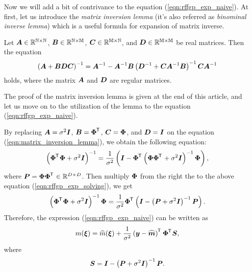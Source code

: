\documentclass[twocolumn, a4paper, 10pt]{article}
\begin{document}
Now we will add a bit of contrivance to the equation (\ref{eqn:rffgp_exp_naive}).
At first, let us introduce the \textit{matrix inversion lemma} (it's also referred as
\textit{binominal inverse lemma}) which is a useful formula for expansion of matrix inverse.  

\begin{theorem}
    Let
    $\boldsymbol{A} \in \mathbb{R^{N \times N}}$,
    $\boldsymbol{B} \in \mathbb{R^{N \times M}}$,
    $\boldsymbol{C} \in \mathbb{R^{M \times N}}$,
    and
    $\boldsymbol{D} \in \mathbb{R^{M \times M}}$
    be real matrices. Then the equation
    \begin{equation}
        \left( \boldsymbol{A} + \boldsymbol{BDC} \right)^{-1} = \boldsymbol{A}^{-1} - \boldsymbol{A}^{-1} \boldsymbol{B}
        \left( \boldsymbol{D}^{-1} + \boldsymbol{CA}^{-1} \boldsymbol{B} \right)^{-1} \boldsymbol{CA}^{-1}
        \label{eqn:matrix_inversion_lemma}
    \end{equation}
    holds, where the matrix $\boldsymbol{A}$ and $\boldsymbol{D}$ are regular matrices.
\end{theorem}

The proof of the matrix inversion lemma is given at the end of this article,
and let us move on to the utilization of the lemma to the equation (\ref{eqn:rffgp_exp_naive}).

By replacing $\boldsymbol{A} = \sigma^2 \boldsymbol{I}$, $\boldsymbol{B} = \boldsymbol{\Phi}^{\mkern-1.5mu\mathsf{T}}\hspace{0.5pt}$, $\boldsymbol{C} = \boldsymbol{\Phi}$,
and $\boldsymbol{D} = \boldsymbol{I}$ on the equation (\ref{eqn:matrix_inversion_lemma}),
we obtain the following equation:
\begin{equation}
    \left( \boldsymbol{\Phi}^{\mkern-1.5mu\mathsf{T}}\hspace{0.5pt} \boldsymbol{\Phi} + \sigma^2 \boldsymbol{I} \right)^{-1}
    = \frac{1}{\sigma^2} \left (\boldsymbol{I} - \boldsymbol{\Phi}^{\mkern-1.5mu\mathsf{T}}\hspace{0.5pt}
    \left( \boldsymbol{\Phi \Phi}^{\mkern-1.5mu\mathsf{T}}\hspace{0.5pt} + \sigma^2 \boldsymbol{I} \right)^{-1} \boldsymbol{\Phi} \right),
    \label{eqn:rffgp_exp_solving}
\end{equation}
where $\boldsymbol{P} = \boldsymbol{\Phi \Phi}^{\mkern-1.5mu\mathsf{T}}\hspace{0.5pt} \in \mathbb{R}^{D \times D}$.
Then multiply $\boldsymbol{\Phi}$ from the right the to the above equation (\ref{eqn:rffgp_exp_solving}),
we get
\begin{equation}
    \left( \boldsymbol{\Phi}^{\mkern-1.5mu\mathsf{T}}\hspace{0.5pt} \boldsymbol{\Phi} + \sigma^2 \boldsymbol{I} \right)^{-1} \boldsymbol{\Phi}
    = \frac{1}{\sigma^2} \boldsymbol{\Phi}^{\mkern-1.5mu\mathsf{T}}\hspace{0.5pt}
    \left( \boldsymbol{I} - \left( \boldsymbol{P} + \sigma^2 \boldsymbol{I} \right)^{-1} \boldsymbol{P} \right).
    \label{eqn:rff_key_eqn}
\end{equation}
Therefore, the expression (\ref{eqn:rffgp_exp_naive}) can be written as
\begin{equation}
    m (\boldsymbol{\xi}) = \widehat{m} (\boldsymbol{\xi}) + \frac{1}{\sigma^2}
    \left( \boldsymbol{y} - \widehat{\boldsymbol{m}} \right)^{\mkern-1.5mu\mathsf{T}}\hspace{0.5pt} \boldsymbol{\Phi}^{\mkern-1.5mu\mathsf{T}}\hspace{0.5pt} \boldsymbol{S},
    \label{eqn:rffgp_exp}
\end{equation}
where
\begin{equation}
    \boldsymbol{S} = \boldsymbol{I} - \left( \boldsymbol{P} + \sigma^2 \boldsymbol{I} \right)^{-1} \boldsymbol{P}.
    \label{eqn:rffgp_exp_cache}
\end{equation}
\end{document}
